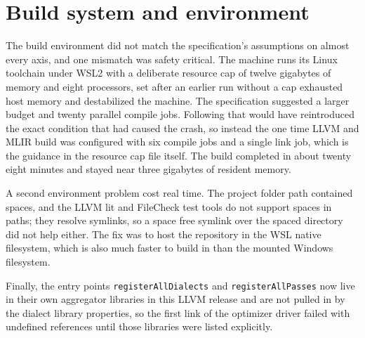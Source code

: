\section{Build system and environment}

The build environment did not match the specification's assumptions on almost
every axis, and one mismatch was safety critical. The machine runs its Linux
toolchain under WSL2 with a deliberate resource cap of twelve gigabytes of memory
and eight processors, set after an earlier run without a cap exhausted host memory
and destabilized the machine. The specification suggested a larger budget and
twenty parallel compile jobs. Following that would have reintroduced the exact
condition that had caused the crash, so instead the one time LLVM and MLIR build
was configured with six compile jobs and a single link job, which is the guidance
in the resource cap file itself. The build completed in about twenty eight minutes
and stayed near three gigabytes of resident memory.

A second environment problem cost real time. The project folder path contained
spaces, and the LLVM lit and FileCheck test tools do not support spaces in paths;
they resolve symlinks, so a space free symlink over the spaced directory did not
help either. The fix was to host the repository in the WSL native filesystem,
which is also much faster to build in than the mounted Windows filesystem.

Finally, the entry points \texttt{registerAllDialects} and
\texttt{registerAllPasses} now live in their own aggregator libraries in this LLVM
release and are not pulled in by the dialect library properties, so the first link
of the optimizer driver failed with undefined references until those libraries
were listed explicitly.
